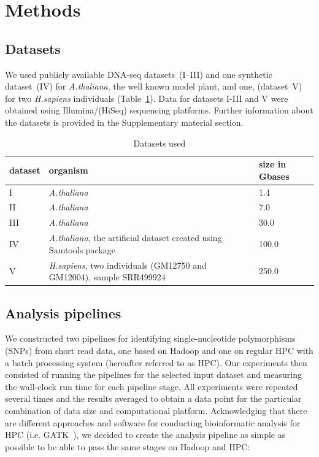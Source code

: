 \documentclass[11pt, oneside]{article}   	%
\begin{document}
\section{Methods}
\label{sectionII}

\subsection{Datasets}
We used publicly available DNA-seq datasets~(I--III) and one synthetic dataset~(IV) for {\it A.thaliana}, the well known model plant, and one, (dataset~V) for two {\it H.sapiens} individuals (Table~\ref{table:datasets}). Data for datasets I-III and V were obtained using Illumina/(HiSeq) sequencing platforms. Further information about the datasets is provided in the Supplementary material section.


\begin{table}[htdp]
\small
\footnotesize
\caption{Datasets used}
\begin{center}
\begin{tabular}{|l|l|l|}
dataset &	organism &	size in Gbases\\
\hline
 I		&	{\it A.thaliana}	&	1.4	\\
 II	&	{\it A.thaliana}	&	7.0\\
  III	&	{\it A.thaliana}	&	30.0	\\
 IV	&{\it A.thaliana}, the artificial dataset created using Samtools package	&	100.0	\\
 V	&	{\it H.sapiens}, two individuals (GM12750 and GM12004), sample SRR499924		&	250.0\\

\end{tabular}
\end{center}
\label{table:datasets}
\normalsize
\end{table}%


\subsection{Analysis pipelines}
We constructed two pipelines for identifying single-nucleotide polymorphisms (SNPs) from short read data, one based on Hadoop and one on regular HPC with a batch processing system (hereafter referred to as HPC). Our experiments then consisted of running the pipelines for the selected input dataset and measuring the wall-clock run time for each pipeline stage. All experiments were repeated several times and the results averaged to obtain a data point for the particular combination of data size and computational platform. Acknowledging that there are different approaches and software for conducting bioinformatic analysis for HPC (i.e. GATK~\cite{gatk}), we decided to create the  analysis pipeline as simple as possible to be able to pass the same stages on Hadoop and HPC:
\end{document}
